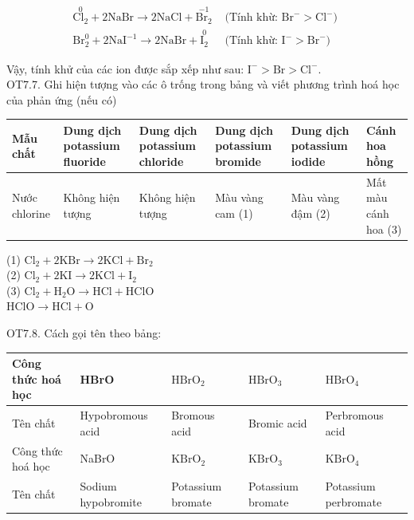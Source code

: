 \documentclass[10pt]{article}
\begin{document}
$$
\begin{array}{ll}
\stackrel{0}{\mathrm{Cl}_{2}}+2 \mathrm{NaBr} \rightarrow 2 \mathrm{NaCl}+\stackrel{-1}{\mathrm{Br}_{2}} & \text { (Tính khừ: } \mathrm{Br}^{-}>\mathrm{Cl}^{-} \text {) } \\
\mathrm{Br}_{2}^{0}+2 \mathrm{Na} \mathrm{I}^{-1} \rightarrow 2 \mathrm{NaBr}+\stackrel{0}{\mathrm{I}_{2}} & \text { (Tính khừ: } \mathrm{I}^{-}>\mathrm{Br}^{-} \text {) }
\end{array}
$$

Vậy, tính khử của các ion được sắp xếp như sau: $\mathrm{I}^{-}>\mathrm{Br}>\mathrm{Cl}^{-}$.\\
OT7.7. Ghi hiện tượng vào các ô trống trong bảng và viết phương trình hoá học của phản ứng (nếu có)

\begin{center}
\begin{tabular}{|l|l|l|l|l|l|}
\hline
Mẫu chất & Dung dịch potassium fluoride & Dung dịch potassium chloride & Dung dịch potassium bromide & Dung dịch potassium iodide & Cánh hoa hồng \\
\hline
Nước chlorine & Không hiện tượng & Không hiện tượng & Màu vàng cam (1) & Màu vàng đậm (2) & Mất màu cánh hoa (3) \\
\hline
\end{tabular}
\end{center}

(1) $\mathrm{Cl}_{2}+2 \mathrm{KBr} \rightarrow 2 \mathrm{KCl}+\mathrm{Br}_{2}$\\
(2) $\mathrm{Cl}_{2}+2 \mathrm{KI} \rightarrow 2 \mathrm{KCl}+\mathrm{I}_{2}$\\
(3) $\mathrm{Cl}_{2}+\mathrm{H}_{2} \mathrm{O} \rightarrow \mathrm{HCl}+\mathrm{HClO}$\\
$\mathrm{HClO} \rightarrow \mathrm{HCl}+\mathrm{O}$

OT7.8. Cách gọi tên theo bảng:

\begin{center}
\begin{tabular}{|l|l|l|l|l|}
\hline
Công thức hoá học & HBrO & $\mathrm{HBrO}_{2}$ & $\mathrm{HBrO}_{3}$ & $\mathrm{HBrO}_{4}$ \\
\hline
Tên chất & Hypobromous acid & Bromous acid & Bromic acid & Perbromous acid \\
\hline
Công thức hoá học & NaBrO & $\mathrm{KBrO}_{2}$ & $\mathrm{KBrO}_{3}$ & $\mathrm{KBrO}_{4}$ \\
\hline
Tên chất & Sodium hypobromite & Potassium bromate & Potassium bromate & Potassium perbromate \\
\hline
\end{tabular}
\end{center}
\end{document}
